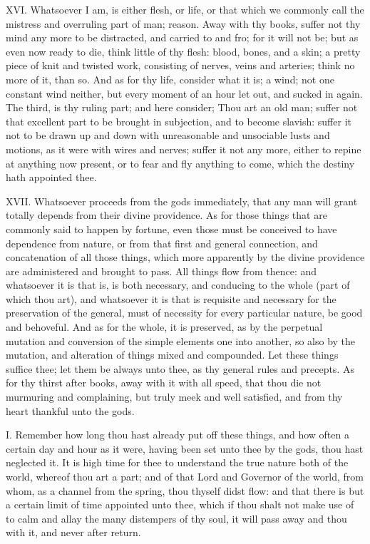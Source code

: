 XVI. Whatsoever I am, is either flesh, or life, or that which we
commonly call the mistress and overruling part of man; reason. Away with
thy books, suffer not thy mind any more to be distracted, and carried to
and fro; for it will not be; but as even now ready to die, think little of
thy flesh: blood, bones, and a skin; a pretty piece of knit and twisted
work, consisting of nerves, veins and arteries; think no more of it, than
so. And as for thy life, consider what it is; a wind; not one constant
wind neither, but every moment of an hour let out, and sucked in again.
The third, is thy ruling part; and here consider; Thou art an old man;
suffer not that excellent part to be brought in subjection, and to become
slavish: suffer it not to be drawn up and down with unreasonable and
unsociable lusts and motions, as it were with wires and nerves; suffer it
not any more, either to repine at anything now present, or to fear and fly
anything to come, which the destiny hath appointed thee.

XVII. Whatsoever proceeds from the gods immediately, that any man will
grant totally depends from their divine providence. As for those things
that are commonly said to happen by fortune, even those must be conceived
to have dependence from nature, or from that first and general connection,
and concatenation of all those things, which more apparently by the divine
providence are administered and brought to pass. All things flow from
thence: and whatsoever it is that is, is both necessary, and conducing to
the whole (part of which thou art), and whatsoever it is that is requisite
and necessary for the preservation of the general, must of necessity for
every particular nature, be good and behoveful. And as for the whole, it
is preserved, as by the perpetual mutation and conversion of the simple
elements one into another, so also by the mutation, and alteration of
things mixed and compounded. Let these things suffice thee; let them be
always unto thee, as thy general rules and precepts. As for thy thirst
after books, away with it with all speed, that thou die not murmuring and
complaining, but truly meek and well satisfied, and from thy heart
thankful unto the gods.


I. Remember how long thou hast already put off these things, and how
often a certain day and hour as it were, having been set unto thee by the
gods, thou hast neglected it. It is high time for thee to understand the
true nature both of the world, whereof thou art a part; and of that Lord
and Governor of the world, from whom, as a channel from the spring, thou
thyself didst flow: and that there is but a certain limit of time
appointed unto thee, which if thou shalt not make use of to calm and allay
the many distempers of thy soul, it will pass away and thou with it, and
never after return.

